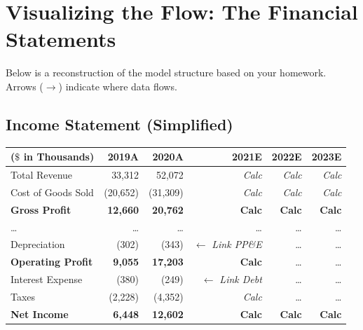 \documentclass[11pt, letterpaper]{article}
\begin{document}
\newpage

\section{Visualizing the Flow: The Financial Statements}
Below is a reconstruction of the model structure based on your homework. Arrows ($\rightarrow$) indicate where data flows.

\subsection{Income Statement (Simplified)}
\begin{table}[H]
\centering
\begin{tabular}{lrrrrr}
\toprule
\textbf{($\$$ in Thousands)} & \textbf{2019A} & \textbf{2020A} & \textbf{2021E} & \textbf{2022E} & \textbf{2023E} \\
\midrule
Total Revenue & 33,312 & 52,072 & \textit{Calc} & \textit{Calc} & \textit{Calc} \\
Cost of Goods Sold & (20,652) & (31,309) & \textit{Calc} & \textit{Calc} & \textit{Calc} \\
\textbf{Gross Profit} & \textbf{12,660} & \textbf{20,762} & \textbf{Calc} & \textbf{Calc} & \textbf{Calc} \\
\dots & \dots & \dots & \dots & \dots & \dots \\
Depreciation & (302) & (343) & $\leftarrow$ \textit{Link PP\&E} & \dots & \dots \\
\textbf{Operating Profit} & \textbf{9,055} & \textbf{17,203} & \textbf{Calc} & \dots & \dots \\
Interest Expense & (380) & (249) & $\leftarrow$ \textit{Link Debt} & \dots & \dots \\
Taxes & (2,228) & (4,352) & \textit{Calc} & \dots & \dots \\
\midrule
\textbf{Net Income} & \textbf{6,448} & \textbf{12,602} & \textbf{Calc} & \textbf{Calc} & \textbf{Calc} \\
\bottomrule
\end{tabular}
\end{table}
\end{document}

